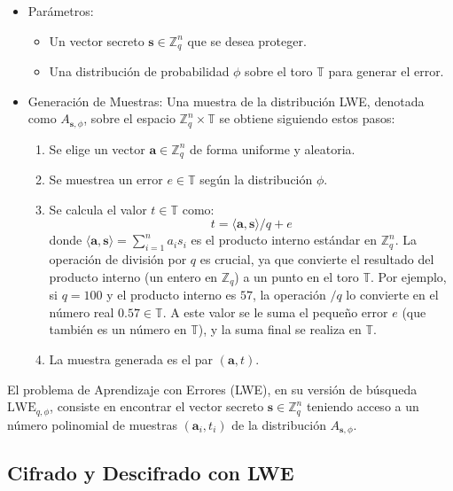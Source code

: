 \begin{itemize}
    \item Parámetros:
    \begin{itemize}
        \item Un vector secreto $\mathbf{s} \in \mathbb{Z}_q^n$ que se desea proteger.
        \item Una distribución de probabilidad $\phi$ sobre el toro $\mathbb{T}$ para generar el error.
    \end{itemize}
    \item Generación de Muestras: Una muestra de la distribución LWE, denotada como $A_{\mathbf{s},\phi}$, sobre el espacio $\mathbb{Z}_q^n \times \mathbb{T}$ se obtiene siguiendo estos pasos:
    \begin{enumerate}
        \item Se elige un vector $\mathbf{a} \in \mathbb{Z}_q^n$ de forma uniforme y aleatoria.
        \item Se muestrea un error $e \in \mathbb{T}$ según la distribución $\phi$.
        \item Se calcula el valor $t \in \mathbb{T}$ como:
        \begin{equation}
            t = \langle \mathbf{a}, \mathbf{s} \rangle / q + e
        \end{equation}
        donde $\langle \mathbf{a}, \mathbf{s} \rangle = \sum_{i=1}^{n} a_i s_i$ es el producto interno estándar en $\mathbb{Z}_q^n$. La operación de división por $q$ es crucial, ya que convierte el resultado del producto interno (un entero en $\mathbb{Z}_q$) a un punto en el toro $\mathbb{T}$. Por ejemplo, si $q=100$ y el producto interno es $57$, la operación $/q$ lo convierte en el número real $0.57 \in \mathbb{T}$. A este valor se le suma el pequeño error $e$ (que también es un número en $\mathbb{T}$), y la suma final se realiza en $\mathbb{T}$.
        \item La muestra generada es el par $(\mathbf{a}, t)$.
    \end{enumerate}
\end{itemize}

El problema de Aprendizaje con Errores (LWE), en su versión de búsqueda $\mathrm{LWE}_{q,\phi}$, consiste en encontrar el vector secreto $\mathbf{s} \in \mathbb{Z}_q^n$ teniendo acceso a un número polinomial de muestras $(\mathbf{a}_i, t_i)$ de la distribución $A_{\mathbf{s},\phi}$. 

\subsection{Cifrado y Descifrado con LWE}

